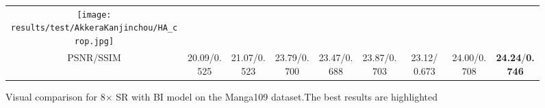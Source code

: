 \documentclass[runningheads]{llncs}
\begin{document}
\begin{figure}[t]
\begin{center}
\begin{tabular}{@{}ccccccccc@{}}
			\texttt{[image: results/test/AkkeraKanjinchou/HA\_crop.jpg]} \\ 


			PSNR/SSIM & 20.09/0.525 &21.07/0.523 &23.79/0.700 &23.47/0.688 &23.87/0.703 &23.12/ 0.673 &24.00/0.708 &\textbf{24.24}/\textbf{0.746} \\
			
			
		\end{tabular}
	\end{center}


	\caption{Visual comparison for 8$\times$ SR with BI model on the Manga109 dataset.The best results are highlighted 
	}

	\label{fig-BD8}
\end{figure}
\end{document}
